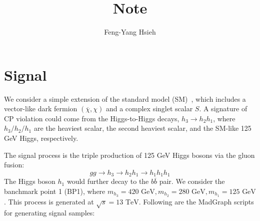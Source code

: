 \documentclass[12pt]{article}
\title{Note}
\author{Feng-Yang Hsieh}
\date{}
\begin{document}
\maketitle


\section{Signal}%
\label{sec:signal}
    We consider a simple extension of the standard model (SM)~\cite{Chen:2022vac}, which includes a vector-like dark fermion $(\overline{\chi}, \chi)$ and a complex singlet scalar $S$. A signature of CP violation could come from the Higgs-to-Higgs decays, $h_3 \to h_2h_1$, where $h_3 / h_2 / h_1$ are the heaviest scalar, the second heaviest scalar, and the SM-like 125 GeV Higgs, respectively.

    The signal process is the triple production of 125 GeV Higgs bosons via the gluon fusion:
    \[
        g g \to h_3 \to h_2 h_1 \to h_1h_1h_1
    \]
    The Higgs boson $h_1$ would further decay to the $b \overline{b}$ pair. We consider the banchmark point 1 (BP1), where $m_{h_3} = \text{420 GeV}, m_{h_2} = \text{280 GeV}, m_{h_1} = \text{125 GeV}$. This process is generated at $\sqrt{s} = \text{13 TeV}$. Following are the MadGraph scripts for generating signal samples:
\end{document}
